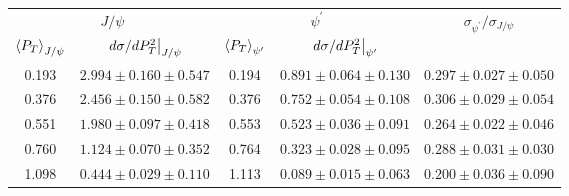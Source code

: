 \begin{tabular}{cc|cc|c}
\hline
\multicolumn{2}{c|}{$J/\psi$} &
  \multicolumn{2}{c|}{$\psi^{\prime}$} &
  \multirow{2}{*}{$\sigma_{\psi^\prime}/\sigma_{J/\psi}$} \\ \cline{1-4}
$\expval{P_T}_{J/\psi}$ &
  $\eval{d\sigma/dP^2_T}_{J/\psi}$ &
  $\expval{P_T}_{\psi^\prime}$ &
  $\eval{d\sigma/dP^2_T}_{\psi^\prime}$ &
   \\ \hline
0.193 & $2.994\pm0.160\pm0.547$ & 0.194 & $0.891\pm0.064\pm0.130$ & $0.297\pm0.027\pm0.050$ \\
0.376 & $2.456\pm0.150\pm0.582$ & 0.376 & $0.752\pm0.054\pm0.108$ & $0.306\pm0.029\pm0.054$ \\
0.551 & $1.980\pm0.097\pm0.418$ & 0.553 & $0.523\pm0.036\pm0.091$ & $0.264\pm0.022\pm0.046$ \\
0.760 & $1.124\pm0.070\pm0.352$ & 0.764 & $0.323\pm0.028\pm0.095$ & $0.288\pm0.031\pm0.030$ \\
1.098 & $0.444\pm0.029\pm0.110$ & 1.113 & $0.089\pm0.015\pm0.063$ & $0.200\pm0.036\pm0.090$ \\ \hline
\end{tabular}
